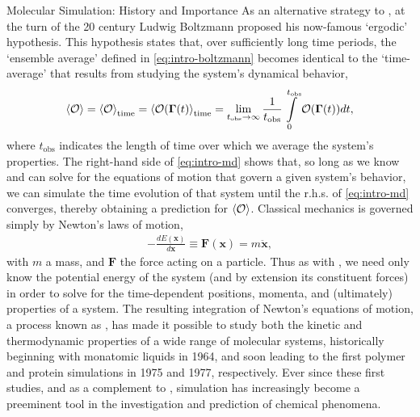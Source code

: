 \begin{section}{Molecular Simulation: History and Importance}
As an alternative strategy to \mc,
at the turn of the 20 century
Ludwig Boltzmann proposed his now-famous `ergodic'
hypothesis.\cite{boltzmann1898vorlesungen} This hypothesis states that, over sufficiently
long time periods, the `ensemble average' defined in \cref{eq:intro-boltzmann} becomes
identical to the `time-average' that results from studying the system's
dynamical behavior,
%
\newcommand{\tobs}{\ensuremath{t_{\text{obs}}}\xspace}
\begin{align}
\label{eq:intro-md}
\braket{\mathcal{O}} = \braket{\mathcal{O}}_{\text{time}} 
= \braket{\mathcal{O}(\bm{\Gamma}(t)}_{\text{time}} 
= \lim_{t_{\text{obs}} \to \infty} \frac{1}{t_{\text{obs}}}
\int\limits_0^{t_{\text{obs}}}
\mathcal{O}(\bm{\Gamma}(t)) dt ,
\end{align}
%
where \tobs indicates the length of time over which we average the system's
properties.\cite{allen1989computer} The
right-hand side of \cref{eq:intro-md} shows that, so long as we know and can
solve for the equations of motion that govern a given system's behavior, we can
simulate the time evolution of that system until the r.h.s. of
\cref{eq:intro-md} converges, thereby obtaining a prediction for
$\braket{\mathcal{O}}$.
Classical mechanics is
governed simply by Newton's laws of motion,
%
\begin{align}
\label{eq:intro-newton}
- \frac{d E(\bm x)}{d \bm x} \equiv \bm F(\bm x) = m \ddot{\bm x}, 
\end{align}
%
with $m$ a mass, and $\bm F$ the force acting on a
particle. Thus as with \mc, we need only know the potential energy of
the system (and by extension its constituent forces)
in order to solve for the
time-dependent positions, momenta, and (ultimately) properties of a system.
The resulting integration of Newton's equations of motion, a process known
as \md,
has made it possible to study both the kinetic and
thermodynamic properties of a wide range of molecular systems, historically beginning with monatomic
liquids in 1964, and soon leading to the first polymer and protein simulations in 1975 and
1977, respectively.\cite{VanGunsteren1990} Ever since these first studies, and
as a complement to \mc, \md simulation has 
increasingly become a preeminent tool in the investigation and prediction of chemical
phenomena.





\end{section}
